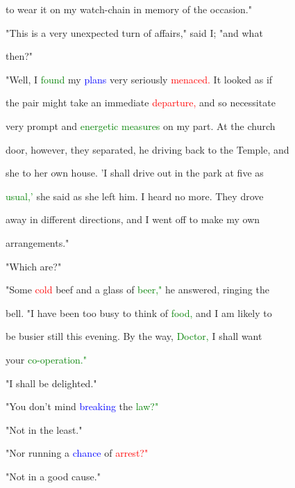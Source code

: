  to \textcolor{BurntOrange}{wear} it on my watch-chain in memory of the occasion."



 "This is a very \textcolor{BurntOrange}{unexpected} turn of affairs," said I; "and what

 then?"



 "Well, I \textcolor{green}{found} my \textcolor{blue}{plans} very seriously \textcolor{red}{menaced.} It looked as if

 the pair might take an immediate \textcolor{red}{departure,} and so necessitate

 very prompt and \textcolor{green}{energetic} \textcolor{green}{measures} on my part. At the \textcolor{BurntOrange}{church}

 door, however, they separated, he driving back to the Temple, and

 she to her own house. 'I shall drive out in the park at five as

 \textcolor{green}{usual,'} she said as she left him. I heard no more. They drove

 away in different directions, and I went off to make my own

 arrangements."



 "Which are?"



 "Some \textcolor{red}{cold} beef and a glass of \textcolor{green}{beer,"} he answered, ringing the

 bell. "I have been too busy to think of \textcolor{green}{food,} and I am likely to

 be busier still this evening. By the way, \textcolor{green}{Doctor,} I shall want

 your \textcolor{green}{co-operation."}



 "I shall be \textcolor{BurntOrange}{delighted."}



 "You don't mind \textcolor{blue}{breaking} the \textcolor{green}{law?"}



 "Not in the least."



 "Nor running a \textcolor{blue}{chance} of \textcolor{red}{arrest?"}



 "Not in a \textcolor{BurntOrange}{good} cause."



